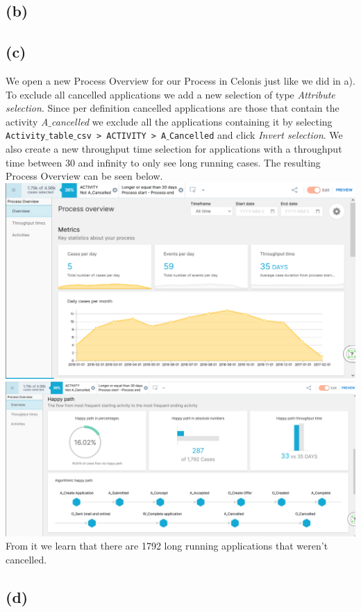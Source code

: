 \documentclass[../../main.tex]{subfiles}
\begin{document}
\subsection*{(b)}
\subsection*{(c)}
We open a new Process Overview for our Process in Celonis just like we did in a). To exclude all cancelled applications we add a new selection of type \textit{Attribute selection}. Since per definition cancelled applications are those that contain the activity \textit{A$\_$cancelled} we exclude all the applications containing it by selecting \texttt{Activity$\_$table$\_$csv > ACTIVITY > A$\_$Cancelled} and click \textit{Invert selection}. We also create a new throughput time selection for applications with a throughput time between 30 and infinity to only see long running cases. The resulting Process Overview can be seen below.\\
\includegraphics[width=\textwidth]{img/QUESTION_5c_process_overview.png}
\includegraphics[width=\textwidth]{img/QUESTION_5c_process_overview_happy_path.png}
From it we learn that there are 1792 long running applications that weren't cancelled. 


\subsection*{(d)}
\end{document}
